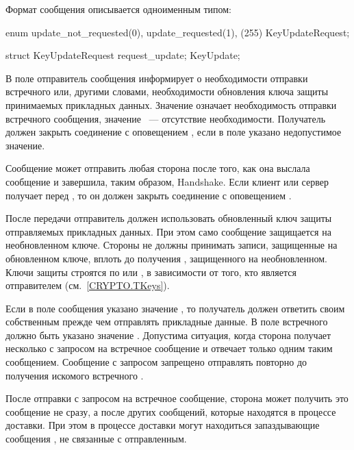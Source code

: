 Формат сообщения  описывается одноименным типом:
%
\begin{codeblock}
enum {
  update_not_requested(0), update_requested(1), (255)
} KeyUpdateRequest;

struct {
  KeyUpdateRequest request_update;
} KeyUpdate;
\end{codeblock}

В поле  отправитель сообщения информирует о 
необходимости отправки встречного  или, другими словами,
необходимости обновления ключа защиты принимаемых прикладных данных.
%
Значение  означает необходимость отправки встречного 
сообщения, значение ~--- отсутствие необходимости.
%
Получатель должен закрыть соединение с оповещением 
, если в поле указано недопустимое 
значение.

Сообщение  может отправить любая сторона после
того, как она выслала сообщение  и завершила,
таким образом, Handshake. 
%
Если клиент или сервер получает  перед 
, то он должен закрыть соединение с оповещением 
. 

После передачи  отправитель должен использовать обновленный ключ 
защиты отправляемых прикладных данных. 
%
При этом само сообщение  защищается на необновленном ключе.
%
Стороны не должны принимать записи, защищенные на обновленном ключе, вплоть до 
получения , защищенного на необновленном.
%
%
Ключи защиты строятся по  или 
, в зависимости от того, 
кто является отправителем (см.~\ref{CRYPTO.TKeys}).

Если в поле  сообщения  указано значение 
, то получатель должен ответить своим собственным
 прежде чем отправлять прикладные данные. 
%
В поле  встречного  должно быть указано 
значение .
%
Допустима ситуация, когда сторона получает несколько  с 
запросом на встречное сообщение и отвечает только одним таким сообщением.
%
Сообщение  с запросом запрещено отправлять повторно до 
получения искомого встречного .

\begin{note}
После отправки  с запросом на встречное сообщение, сторона 
может получить это сообщение не сразу, а после других сообщений, которые 
находятся в процессе доставки. При этом в процессе доставки могут находиться 
запаздывающие сообщения , не связанные с отправленным.
\end{note}

